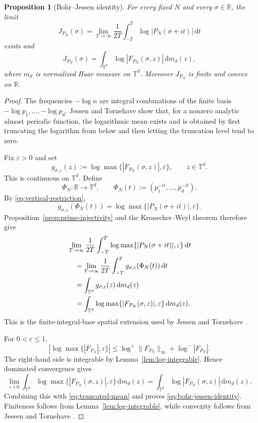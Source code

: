\documentclass[11pt]{article}
\newtheorem{proposition}[theorem]{Proposition}
\theoremstyle{definition}
\newcommand{\R}{\mathbb R}
\newcommand{\T}{\mathbb T}
\newcommand{\dd}{\,\mathrm d}
\newcommand{\1}{\mathbf 1}
\begin{document}
\begin{proposition}[Bohr--Jessen identity]\label{prop:bohr-jessen}
For every fixed $N$ and every $\sigma\in\R$, the limit
\begin{equation}\label{eq:Jessen-general}
J_{P_N}(\sigma)
=
\lim_{T\to\infty}\frac1{2T}
\int_{-T}^{T}\log|P_N(\sigma+it)|\dd t
\end{equation}
exists and
\begin{equation}\label{eq:bohr-jessen-identity}
J_{P_N}(\sigma)
=
\int_{\T^d}\log|F_{P_N}(\sigma,z)|\dd m_d(z),
\end{equation}
where $m_d$ is normalized Haar measure on $\T^d$.  Moreover $J_{P_N}$ is finite and convex on $\R$.
\end{proposition}

\begin{proof}
The frequencies $-\log n$ are integral combinations of the finite basis $-\log p_1,\ldots,-\log p_d$.  Jessen and Tornehave \cite[Theorem~5]{JessenTornehave1945} show that, for a nonzero analytic almost periodic function, the logarithmic mean exists and is obtained by first truncating the logarithm from below and then letting the truncation level tend to zero.

Fix $\varepsilon>0$ and set
\[
g_{\sigma,\varepsilon}(z)
:=\log\max\{|F_{P_N}(\sigma,z)|,\varepsilon\},
\qquad z\in\T^d.
\]
This is continuous on $\T^d$.  Define
\[
\Phi_N:\R\longrightarrow\T^d,
\qquad
\Phi_N(t):=(p_1^{-it},\ldots,p_d^{-it}).
\]
By \eqref{eq:vertical-restriction},
\[
g_{\sigma,\varepsilon}(\Phi_N(t))
=
\log\max\{|P_N(\sigma+it)|,\varepsilon\}.
\]
Proposition~\ref{prop:prime-injectivity} and the Kronecker--Weyl theorem therefore give
\begin{align}
&\lim_{T\to\infty}\frac1{2T}
\int_{-T}^{T}
\log\max\{|P_N(\sigma+it)|,\varepsilon\}\dd t\notag\\
&\quad=
\lim_{T\to\infty}\frac1{2T}
\int_{-T}^{T}g_{\sigma,\varepsilon}(\Phi_N(t))\dd t\notag\\
&\quad=
\int_{\T^d}g_{\sigma,\varepsilon}(z)\dd m_d(z)\notag\\
&\quad=
\int_{\T^d}
\log\max\{|F_{P_N}(\sigma,z)|,\varepsilon\}\dd m_d(z).
\label{eq:truncated-mean}
\end{align}
This is the finite-integral-base spatial extension used by Jessen and Tornehave \cite[\S116]{JessenTornehave1945}.

For $0<\varepsilon\le1$,
\[
\left|\log\max\{|F_{P_N}|,\varepsilon\}\right|
\le
\log^+\|F_{P_N}\|_\infty+\log^-|F_{P_N}|.
\]
The right-hand side is integrable by Lemma~\ref{lem:log-integrable}.  Hence dominated convergence gives
\[
\lim_{\varepsilon\downarrow0}
\int_{\T^d}
\log\max\{|F_{P_N}(\sigma,z)|,\varepsilon\}\dd m_d(z)
=
\int_{\T^d}\log|F_{P_N}(\sigma,z)|\dd m_d(z).
\]
Combining this with \eqref{eq:truncated-mean} and \cite[Theorem~5]{JessenTornehave1945} proves \eqref{eq:bohr-jessen-identity}. Finiteness follows from Lemma~\ref{lem:log-integrable}, while
convexity follows from Jessen and Tornehave \cite[Theorem~7]{JessenTornehave1945}.
\end{proof}
\end{document}
